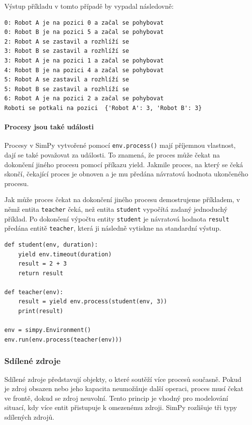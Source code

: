 \documentclass[
  program=itp,
  biblatex,
  figures=false,
  glossaries,
  index
]{kidiplom}
\begin{document}
\noindent Výstup příkladu v tomto případě by vypadal následovně:

\begin{verbatim}
0: Robot A je na pozici 0 a začal se pohybovat
0: Robot B je na pozici 5 a začal se pohybovat
2: Robot A se zastavil a rozhlíží se
3: Robot B se zastavil a rozhlíží se
3: Robot A je na pozici 1 a začal se pohybovat
4: Robot B je na pozici 4 a začal se pohybovat
5: Robot A se zastavil a rozhlíží se
5: Robot B se zastavil a rozhlíží se
6: Robot A je na pozici 2 a začal se pohybovat
Roboti se potkali na pozici  {'Robot A': 3, 'Robot B': 3}
\end{verbatim}

\paragraph{Procesy jsou také události}
Procesy v SimPy vytvořené pomocí \texttt{env.process()} mají příjemnou vlastnost, dají se také považovat za události. To znamená, že proces může čekat na dokončení jiného procesu pomocí příkazu yield. Jakmile proces, na který se čeká skončí, čekající proces je obnoven a je mu předána návratová hodnota ukončeného procesu.

Jak může proces čekat na dokončení jiného procesu demostrujeme příkladem, v němž entita \texttt{teacher} čeká, než entita \texttt{student} vypočítá zadaný jednoduchý příklad. Po dokončení výpočtu entity \texttt{student} je návratová hodnota \texttt{result} předána entitě \texttt{teacher}, která ji následně vytiskne na standardní výstup. 

\begin{verbatim}
def student(env, duration):
    yield env.timeout(duration)
    result = 2 + 3
    return result

def teacher(env):
    result = yield env.process(student(env, 3))
    print(result)

env = simpy.Environment()
env.run(env.process(teacher(env)))
\end{verbatim}

\subsubsection{Sdílené zdroje}

Sdílené zdroje představují objekty, o které soutěží více procesů současně. Pokud je zdroj obsazen nebo jeho kapacita neumožňuje další operaci, proces musí čekat ve frontě, dokud se zdroj neuvolní. Tento princip je vhodný pro modelování situací, kdy více entit přistupuje k omezenému zdroji. SimPy rozlišuje tři typy sdílených zdrojů.
\end{document}
